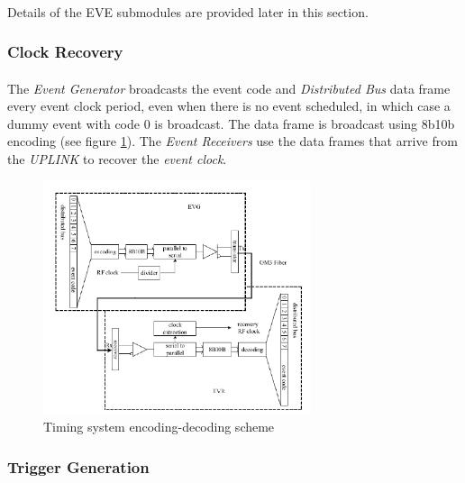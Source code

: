 \documentclass[openany]{article}
\begin{document}
		\paragraph{} Details of the EVE submodules are provided later in this section.

		\subsubsection{Clock Recovery}\label{sec:eve-clock-recovery}

			\paragraph{} The \emph{Event Generator} broadcasts the event code and \emph{Distributed Bus} data frame every event clock period, even when there is no event scheduled, in which case a dummy event with code 0 is broadcast. The data frame is broadcast using 8b10b encoding (see figure \ref{fig:encoding-decoding}). The \emph{Event Receivers} use the data frames that arrive from the \emph{UPLINK} to recover the \emph{event clock}.

			\begin{figure}[!h]
			\caption{Timing system encoding-decoding scheme}
			\label{fig:encoding-decoding}
			\centering
			\includegraphics[width=0.7\textwidth]{encoding-decoding-image}
			\end{figure}
\FloatBarrier

		\subsubsection{Trigger Generation}\label{sec:eve-trigger-generation}
\end{document}
